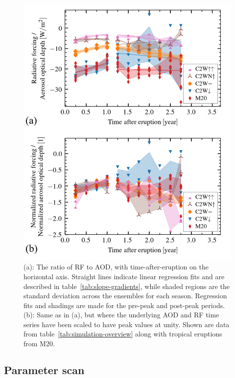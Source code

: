 \documentclass[draft]{agujournal2019}
\begin{document}
\begin{figure}
  \centering
  \includegraphics{figures/figure3.png}

  \caption{(a): The ratio of RF to AOD, with time-after-eruption on the horizontal axis.
    Straight lines indicate linear regression fits and are described in
    table~\ref{tab:slope-gradients}, while shaded regions are the standard deviation across
    the ensembles for each season. Regression fits and shadings are made for the pre-peak
    and post-peak periods. (b): Same as in (a), but where the underlying AOD and RF time
    series have been scaled to have peak values at unity. Shown are data from
    table~\ref{tab:simulation-overview} along with tropical eruptions from
    M20.}\label{fig:3_rf_to_aod_ratios}%
\end{figure}

\subsection{Parameter scan}
\end{document}
